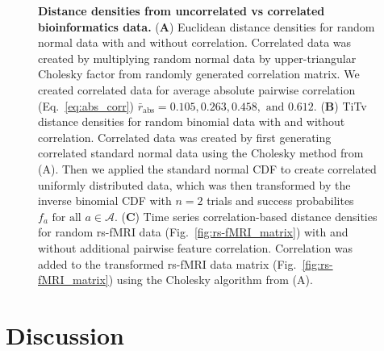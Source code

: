 \documentclass[10pt,letterpaper]{article}
\begin{document}

\begin{figure}[H]
	\centering
	\caption{{\bf Distance densities from uncorrelated vs correlated bioinformatics data.} (\textbf{A}) Euclidean distance densities for random normal data with and without correlation. Correlated data was created by multiplying random normal data by upper-triangular Cholesky factor from randomly generated correlation matrix. We created correlated data for average absolute pairwise correlation (Eq.~\ref{eq:abs_corr}) $\bar{r}_\text{abs} = 0.105, 0.263, 0.458, \text{ and } 0.612$. (\textbf{B}) TiTv distance densities for random binomial data with and without correlation. Correlated data was created by first generating correlated standard normal data using the Cholesky method from (A). Then we applied the standard normal CDF to create correlated uniformly distributed data, which was then transformed by the inverse binomial CDF with $n=2$ trials and success probabilites $f_a \text{ for all } a \in \mathcal{A}$. (\textbf{C}) Time series correlation-based distance densities for random rs-fMRI data (Fig.~\ref{fig:rs-fMRI_matrix}) with and without additional pairwise feature correlation. Correlation was added to the transformed rs-fMRI data matrix (Fig.~\ref{fig:rs-fMRI_matrix}) using the Cholesky algorithm from (A).}\label{fig:null_vs_correlated_ridge}
\end{figure}

\section{Discussion}\label{sec:discussion}
\end{document}
